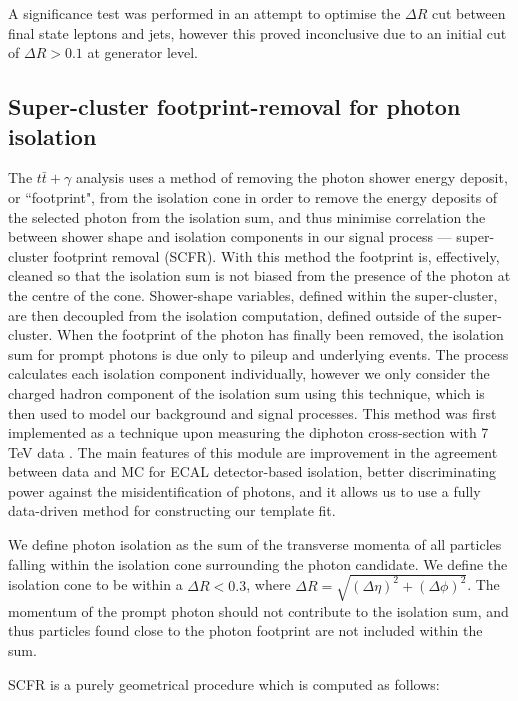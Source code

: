 A significance test was performed in an attempt to optimise the $\Delta R$ cut between final state leptons and jets, however this proved inconclusive due to an initial cut of $\Delta R > 0.1$ at generator level.

\subsection{Super-cluster footprint-removal for photon isolation} \label{subsec-SCFR}

The $t\bar{t}+\gamma$ analysis uses a method of removing the photon shower energy deposit, or ``footprint", from the isolation cone in order to remove the energy deposits of the selected photon from the isolation sum, and thus minimise correlation the between shower shape and isolation components in our signal process --- super-cluster footprint removal (SCFR). With this method the footprint is, effectively, cleaned so that the isolation sum is not biased from the presence of the photon at the centre of the cone. Shower-shape variables, defined within the super-cluster, are then decoupled from the isolation computation, defined outside of the super-cluster. When the footprint of the photon has finally been removed, the isolation sum for prompt photons is due only to pileup and underlying events. The process calculates each isolation component individually, however we only consider the charged hadron component of the isolation sum using this technique, which is then used to model our background and signal processes. This method was first implemented as a technique upon measuring the diphoton cross-section with 7 TeV data \cite{AN-12-485}. The main features of this module are improvement in the agreement between data and MC for ECAL detector-based isolation, better discriminating power against the misidentification of photons, and it allows us to use a fully data-driven method for constructing our template fit.

We define photon isolation as the sum of the transverse momenta of all particles falling within the isolation cone surrounding the photon candidate. We define the isolation cone to be within a $\Delta R < 0.3$, where $\Delta R = \sqrt{(\Delta\eta)^2+(\Delta\phi)^2}$. The momentum of the prompt photon should not contribute to the isolation sum, and thus particles found close to the photon footprint are not included within the sum. 

SCFR is a purely geometrical procedure which is computed as follows:

